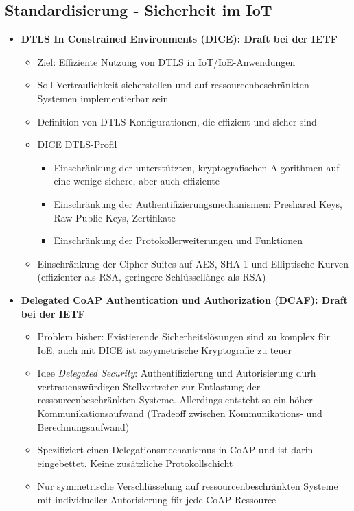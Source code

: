 \subsection{Standardisierung - Sicherheit im IoT}
\begin{itemize}
	\item \textbf{DTLS In Constrained Environments (DICE): Draft bei der IETF}
	\begin{itemize}
		\item Ziel: Effiziente Nutzung von DTLS in IoT/IoE-Anwendungen
		\item Soll Vertraulichkeit sicherstellen und auf ressourcenbeschränkten Systemen implementierbar sein
		\item Definition von DTLS-Konfigurationen, die effizient und sicher sind
		\item DICE DTLS-Profil
		\begin{itemize}
			\item Einschränkung der unterstützten, kryptografischen Algorithmen auf eine wenige sichere, aber auch effiziente
			\item Einschränkung der Authentifizierungsmechanismen: Preshared Keys, Raw Public Keys, Zertifikate
			\item Einschränkung der Protokollerweiterungen und Funktionen
		\end{itemize}
		\item Einschränkung der Cipher-Suites auf AES, SHA-1 und Elliptische Kurven (effizienter als RSA, geringere Schlüssellänge als RSA)
	\end{itemize}
	\item \textbf{Delegated CoAP Authentication und Authorization (DCAF): Draft bei der IETF}
	\begin{itemize}
		\item Problem bisher: Existierende Sicherheitslösungen sind zu komplex für IoE, auch mit DICE ist asyymetrische Kryptografie zu teuer
		\item Idee \textit{Delegated Security}: Authentifizierung und Autorisierung durh vertrauenswürdigen Stellvertreter zur Entlastung der ressourcenbeschränkten Systeme. Allerdings entsteht so ein höher Kommunikationsaufwand (Tradeoff zwischen Kommunikations- und Berechnungsaufwand)
		\item Spezifiziert einen Delegationsmechanismus in CoAP und ist darin eingebettet. Keine zusätzliche Protokollschicht
		\item Nur symmetrische Verschlüsselung auf ressourcenbeschränkten Systeme mit individueller Autorisierung für jede CoAP-Ressource

\end{itemize}
\end{itemize}
